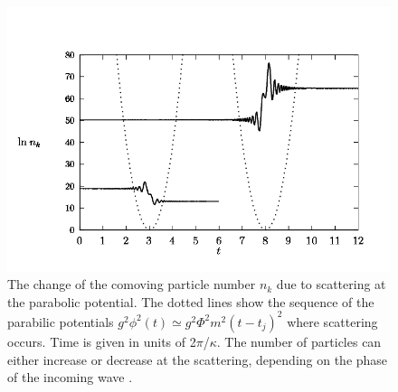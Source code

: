 \documentclass[11pt,a4paper,twoside]{book}
\begin{document}
\begin{figure}
	\centering
	\includegraphics[width=0.65\linewidth, height=0.4\textheight]{Images/Chap4/Linde_Fig8}
	\caption{The change  of the comoving particle number $ n_{k} $ due to scattering at the parabolic potential. The dotted lines show the sequence of the parabilic potentials $ g^{2}\phi^{2}(t) \simeq g^{2}\Phi^{2}m^{2}(t-t_{j})^{2} $ where scattering occurs. Time is given in units of 2$\pi$/$\kappa$. The number of particles can either increase or decrease at the scattering, depending on the phase of the incoming wave \cite{Chap4:LindePreheatingModel}.}
	\label{fig:lindefig8}
\end{figure}
\end{document}
